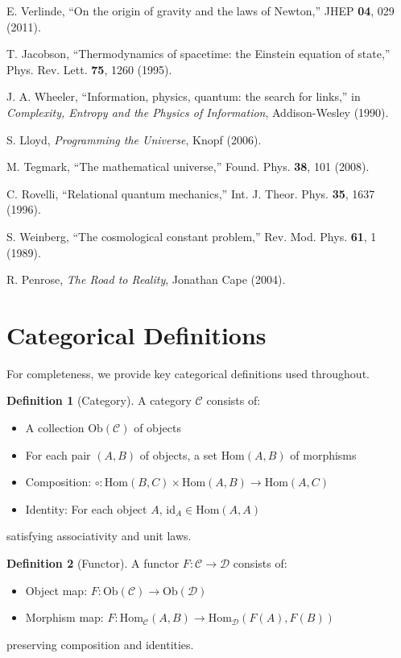 \documentclass[11pt,a4paper]{article}
\theoremstyle{definition}
\newtheorem{definition}{Definition}[section]
\newcommand{\id}{\text{id}}
\begin{document}
\begin{thebibliography}{99}
E. Verlinde, ``On the origin of gravity and the laws of Newton,'' JHEP \textbf{04}, 029 (2011).

T. Jacobson, ``Thermodynamics of spacetime: the Einstein equation of state,'' Phys. Rev. Lett. \textbf{75}, 1260 (1995).

J. A. Wheeler, ``Information, physics, quantum: the search for links,'' in \textit{Complexity, Entropy and the Physics of Information}, Addison-Wesley (1990).

S. Lloyd, \textit{Programming the Universe}, Knopf (2006).

M. Tegmark, ``The mathematical universe,'' Found. Phys. \textbf{38}, 101 (2008).

C. Rovelli, ``Relational quantum mechanics,'' Int. J. Theor. Phys. \textbf{35}, 1637 (1996).

S. Weinberg, ``The cosmological constant problem,'' Rev. Mod. Phys. \textbf{61}, 1 (1989).

R. Penrose, \textit{The Road to Reality}, Jonathan Cape (2004).

\end{thebibliography}

\appendix

\section{Categorical Definitions}

For completeness, we provide key categorical definitions used throughout.

\begin{definition}[Category]
A category $\mathcal{C}$ consists of:
\begin{itemize}
\item A collection $\text{Ob}(\mathcal{C})$ of objects
\item For each pair $(A,B)$ of objects, a set $\text{Hom}(A,B)$ of morphisms
\item Composition: $\circ: \text{Hom}(B,C) \times \text{Hom}(A,B) \to \text{Hom}(A,C)$
\item Identity: For each object $A$, $\id_A \in \text{Hom}(A,A)$
\end{itemize}
satisfying associativity and unit laws.
\end{definition}

\begin{definition}[Functor]
A functor $F: \mathcal{C} \to \mathcal{D}$ consists of:
\begin{itemize}
\item Object map: $F: \text{Ob}(\mathcal{C}) \to \text{Ob}(\mathcal{D})$
\item Morphism map: $F: \text{Hom}_\mathcal{C}(A,B) \to \text{Hom}_\mathcal{D}(F(A),F(B))$
\end{itemize}
preserving composition and identities.
\end{definition}
\end{document}

